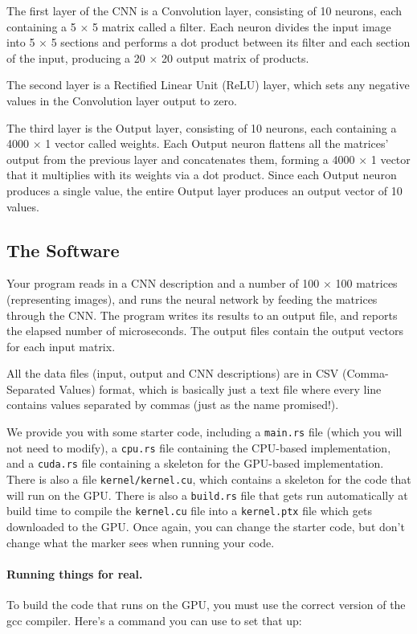 The first layer of the CNN is a Convolution layer, consisting of 10 neurons, each containing a 5 $\times$ 5 matrix called a filter. Each neuron divides the input image into 5 $\times$ 5 sections and performs a dot product between its filter and each section of the input, producing a 20 $\times$ 20 output matrix of products.

The second layer is a Rectified Linear Unit (ReLU) layer, which sets any negative values in the Convolution layer output to zero.

The third layer is the Output layer, consisting of 10 neurons, each containing a 4000 $\times$ 1 vector called weights. Each Output neuron flattens all the matrices' output from the previous layer and concatenates them, forming a 4000 $\times$ 1 vector that it multiplies with its weights via a dot product. Since each Output neuron produces a single value,  the entire Output layer produces an output vector of 10 values.

\subsection*{The Software}

Your program reads in a CNN description and a number of 100 $\times$ 100 matrices (representing images), and runs the neural network by feeding the matrices through the CNN. The program writes its results to an output file, and reports the elapsed number of microseconds. The output files contain the output vectors for each input matrix.

All the data files (input, output and CNN descriptions) are in CSV (Comma-Separated Values) format, which is basically just a text file where every line contains values separated by commas (just as the name promised!).

We provide you with some starter code, including a \texttt{main.rs} file (which you will not need to modify), a \texttt{cpu.rs} file containing the CPU-based implementation, and a \texttt{cuda.rs} file containing a skeleton for the GPU-based implementation. There is also a file \texttt{kernel/kernel.cu}, which contains a skeleton for the code that will run on the GPU. There is also a \texttt{build.rs} file that gets run automatically at build time to compile the \texttt{kernel.cu} file into a \texttt{kernel.ptx} file which gets downloaded to the GPU. Once again, you can change the starter code, but don't change what the marker sees when running your code.


\paragraph{Running things for real.}
To build the code that runs on the GPU, you must use the correct version of the gcc compiler. Here's a command you can use to set that up:

